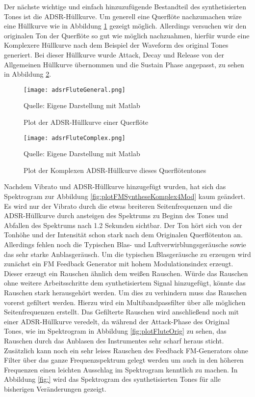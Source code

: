Der nächste wichtige und einfach hinzuzufügende Bestandteil des synthetisierten Tones ist die ADSR-Hüllkurve. Um generell eine Querflöte nachzumachen wäre eine Hüllkurve wie in Abbildung \ref{fig:adsrFluteGeneral} gezeigt möglich. Allerdings versuchen wir den originalen Ton der Querflöte so gut wie möglich nachzuahmen, hierfür wurde eine Komplexere Hüllkurve nach dem Beispiel der Waveform des original Tones generiert. Bei dieser Hüllkurve wurde Attack, Decay und Release von der Allgemeinen Hüllkurve übernommen und die Sustain Phase angepasst, zu sehen in Abbildung \ref{fig:adsrFluteComplex}. 

\begin{figure} [ht]
\centering
  \texttt{[image: adsrFluteGeneral.png]}
\caption{Plot der ADSR-Hüllkurve einer Querflöte}
\label{fig:adsrFluteGeneral}
Quelle: Eigene Darstellung mit Matlab
\end{figure}

\begin{figure} [ht]
\centering
  \texttt{[image: adsrFluteComplex.png]}
\caption{Plot der Komplexen ADSR-Hüllkurve dieses Querflötentones}
\label{fig:adsrFluteComplex}
Quelle: Eigene Darstellung mit Matlab
\end{figure}

Nachdem Vibrato und ADSR-Hüllkurve hinzugefügt wurden, hat sich das Spektrogram zur Abbildung \ref{fig:plotFMSyntheseKomplex4Mod} kaum geändert. Es wird nur der Vibrato durch die etwas breiteren Seitenfrequenzen und die ADSR-Hüllkurve durch ansteigen des Spektrums zu Beginn des Tones und Abfallen des Spektrums nach 1.2 Sekunden sichtbar. Der Ton hört sich von der Tonhöhe und der Intensität schon stark nach dem Originalen Querflötenton an. Allerdings fehlen noch die Typischen Blas- und Luftverwirblungsgeräusche sowie das sehr starke Anblasgeräusch. Um die typischen Blasgeräusche zu erzeugen wird zunächst ein FM Feedback Generator mit hohem Modulationsindex erzeugt. Dieser erzeugt ein Rauschen ähnlich dem weißen Rauschen. Würde das Rauschen ohne weitere Arbeitsschritte dem synthetisiertem Signal hinzugefügt, könnte das Rauschen stark herausgehört werden. Um dies zu verhindern muss das Rauschen vorerst gefiltert werden. Hierzu wird ein Multibandpassfilter über alle möglichen Seitenfrequenzen erstellt. Das Gefilterte Rauschen wird anschließend noch mit einer ADSR-Hüllkurve veredelt, da während der Attack-Phase des Original Tones, wie im Spektrogram in Abbildung \ref{fig:plotFluteOrig} zu sehen, das Rauschen durch das Anblasen des Instrumentes sehr scharf heraus sticht. Zusätzlich kann noch ein sehr leises Rauschen des Feedback FM-Generators ohne Filter über das ganze Frequenzspektrum gelegt werden um auch in den höheren Frequenzen einen leichten Ausschlag im Spektrogram kenntlich zu machen. In Abbildung \ref{fig:} wird das Spektrogram des synthetisierten Tones für alle bisherigen Veränderungen gezeigt.

